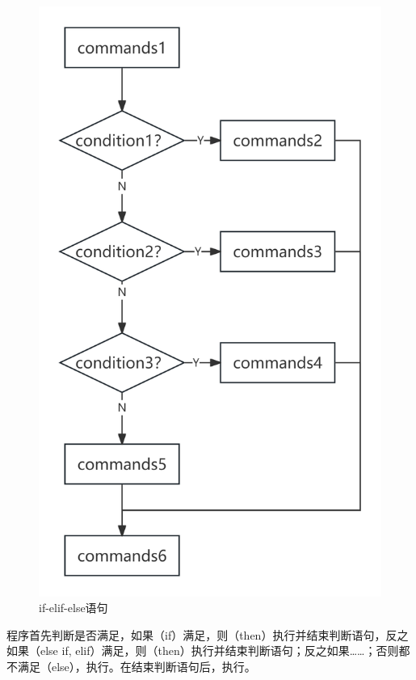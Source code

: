 \begin{figure}
    \centering
    \includegraphics[width=1\linewidth]{Linux基础/Shell脚本基础/判断语句/fig/if-elif-else语句.png}
    \caption{if-elif-else语句}
    \label{fig:if-elif-else语句}
\end{figure}

程序首先判断是否满足，如果（if）满足，则（then）执行并结束判断语句，反之如果（else if, elif）满足，则（then）执行并结束判断语句；反之如果……；否则都不满足（else），执行。在结束判断语句后，执行。

